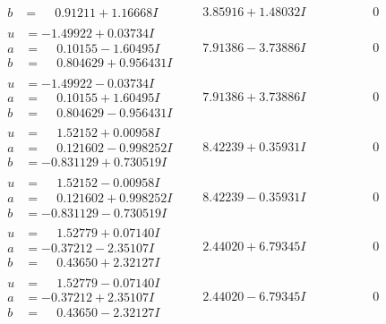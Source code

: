 \documentclass[1p]{elsarticle_modified}
\theoremstyle{definition}
\begin{document}
$$\begin{array}{c|c|c}
\begin{aligned}
b &= \phantom{-}0.91211 + 1.16668 I\end{aligned}
 & \phantom{-}3.85916 + 1.48032 I & \phantom{-0.000000 } 0 \\ \hline\begin{aligned}
u &= -1.49922 + 0.03734 I \\
a &= \phantom{-}0.10155 - 1.60495 I \\
b &= \phantom{-}0.804629 + 0.956431 I\end{aligned}
 & \phantom{-}7.91386 - 3.73886 I & \phantom{-0.000000 } 0 \\ \hline\begin{aligned}
u &= -1.49922 - 0.03734 I \\
a &= \phantom{-}0.10155 + 1.60495 I \\
b &= \phantom{-}0.804629 - 0.956431 I\end{aligned}
 & \phantom{-}7.91386 + 3.73886 I & \phantom{-0.000000 } 0 \\ \hline\begin{aligned}
u &= \phantom{-}1.52152 + 0.00958 I \\
a &= \phantom{-}0.121602 - 0.998252 I \\
b &= -0.831129 + 0.730519 I\end{aligned}
 & \phantom{-}8.42239 + 0.35931 I & \phantom{-0.000000 } 0 \\ \hline\begin{aligned}
u &= \phantom{-}1.52152 - 0.00958 I \\
a &= \phantom{-}0.121602 + 0.998252 I \\
b &= -0.831129 - 0.730519 I\end{aligned}
 & \phantom{-}8.42239 - 0.35931 I & \phantom{-0.000000 } 0 \\ \hline\begin{aligned}
u &= \phantom{-}1.52779 + 0.07140 I \\
a &= -0.37212 - 2.35107 I \\
b &= \phantom{-}0.43650 + 2.32127 I\end{aligned}
 & \phantom{-}2.44020 + 6.79345 I & \phantom{-0.000000 } 0 \\ \hline\begin{aligned}
u &= \phantom{-}1.52779 - 0.07140 I \\
a &= -0.37212 + 2.35107 I \\
b &= \phantom{-}0.43650 - 2.32127 I\end{aligned}
 & \phantom{-}2.44020 - 6.79345 I & \phantom{-0.000000 } 0 \\ \hline\begin{aligned}

\end{aligned}
\end{array}$$
\end{document}
